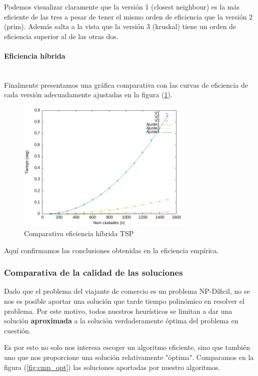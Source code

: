 \documentclass{article}
\newcommand{\myparagraph}[1]{\paragraph{#1}\mbox{}\\}
\begin{document}
Podemos visualizar claramente que la versión 1 (closest neighbour) es la más eficiente de las tres a pesar de tener el mismo orden de eficiencia que la versión 2 (prim). Además salta a la vista que la versión 3 (kruskal) tiene un orden de eficiencia superior al de las otras dos.

\myparagraph{Eficiencia híbrida}

Finalmente presentamos una gráfica comparativa con las curvas de eficiencia de cada versión adecuadamente ajustadas en la figura (\ref{fig:cmp_hib}).

\begin{figure}
    \centering
    \includegraphics[width=0.75\textwidth]{Problema4/imagenes/Salida_comparativa.png}
    \caption{Comparativa eficiencia híbrida TSP}
    \label{fig:cmp_hib}
\end{figure}

Aquí confirmamos las conclusiones obtenidas en la eficiencia empírica.

\subsubsection{Comparativa de la calidad de las soluciones}

Dado que el problema del viajante de comercio es un problema NP-Díficil, no se nos es posible aportar una solución que tarde tiempo polinómico en resolver el problema. Por este motivo, todos nuestros heurísticos se limitan a dar una solución \textbf{aproximada} a la solución verdaderamente óptima del problema en cuestión.

Es por esto no solo nos interesa escoger un algoritmo eficiente, sino que también uno que nos proporcione una solución relativamente "óptima". Comparamos en la figura (\ref{fig:cmp_opt}) las soluciones aportadas por nuestro algoritmos.
\end{document}
